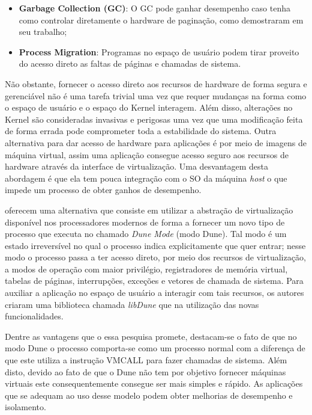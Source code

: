 \begin{itemize}
  \item \textbf{Garbage Collection (GC)}: O GC pode ganhar desempenho caso
        tenha como controlar diretamente o hardware de paginação, como
        \cite{pauseless} demostraram em seu trabalho;
  \item \textbf{Process Migration}: Programas no espaço de usuário podem tirar
        proveito do acesso direto as faltas de páginas e chamadas de sistema.
\end{itemize}

Não obstante, fornecer o acesso direto aos recursos de hardware de forma segura
e gerenciável não é uma tarefa trivial uma vez que requer mudanças na forma
como o espaço de usuário e o espaço do Kernel interagem. Além disso, alterações
no Kernel são consideradas invasivas e perigosas uma vez que uma modificação
feita de forma errada pode comprometer toda a estabilidade do sistema. Outra
alternativa para dar acesso de hardware para aplicações é por meio de imagens
de máquina virtual, assim uma aplicação consegue acesso seguro aos recursos de
hardware através da interface de virtualização. Uma desvantagem desta abordagem
é que ela tem pouca integração com o SO da máquina \emph{host} o que impede um
processo de obter ganhos de desempenho.

\cite{belay} oferecem uma alternativa que consiste em utilizar a abstração de
virtualização disponível nos processadores modernos de forma a fornecer um novo
tipo de processo que executa no chamado \emph{Dune Mode} (modo Dune). Tal modo
é um estado irreversível no qual o processo indica explicitamente que quer
entrar; nesse modo o processo passa a ter acesso direto, por meio dos recursos
de virtualização, a modos de operação com maior privilégio, registradores de
memória virtual, tabelas de páginas, interrupções, exceções e vetores de
chamada de sistema. Para auxiliar a aplicação no espaço de usuário a interagir
com tais recursos, os autores criaram uma biblioteca chamada \emph{libDune} que
na utilização das novas funcionalidades.

Dentre as vantagens que o essa pesquisa promete, destacam-se o fato de que no
modo Dune o processo comporta-se como um processo normal com a diferença de que
este utiliza a instrução VMCALL para fazer chamadas de sistema. Além disto,
devido ao fato de que o Dune não tem por objetivo fornecer máquinas virtuais
este consequentemente consegue ser mais simples e rápido. As aplicações que se
adequam ao uso desse modelo podem obter melhorias de desempenho e isolamento.

